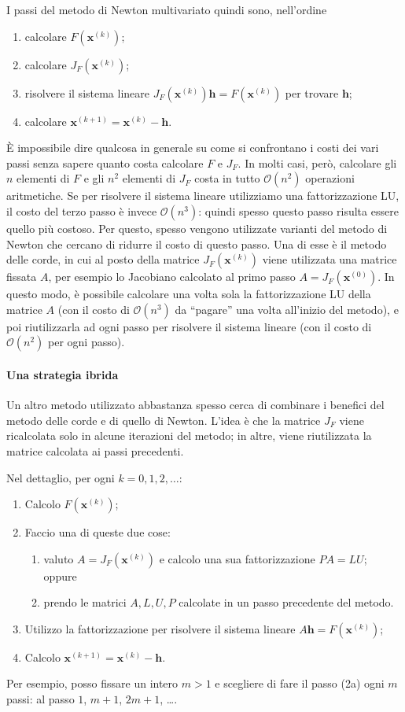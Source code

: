 \documentclass[a4paper]{report}
\theoremstyle{definiton}
\theoremstyle{remark}
\newcommand{\x}{\mathbf{x}}
\begin{document}
I passi del metodo di Newton multivariato quindi sono, nell'ordine
\begin{enumerate}
    \item calcolare $F(\x^{(k)})$;
    \item calcolare $J_F(\x^{(k)})$;
    \item risolvere il sistema lineare $J_F(\x^{(k)}) \mathbf{h} = F(\x^{(k)})$ per trovare $\mathbf{h}$;
    \item calcolare $\x^{(k+1)} = \x^{(k)} - \mathbf{h}$.
\end{enumerate}
È impossibile dire qualcosa in generale su come si confrontano i costi dei vari passi senza sapere quanto costa calcolare $F$ e $J_F$. In molti casi, però, calcolare gli $n$ elementi di $F$ e gli $n^2$ elementi di $J_F$ costa in tutto $\mathcal{O}(n^2)$ operazioni aritmetiche. Se per risolvere il sistema lineare utilizziamo una fattorizzazione LU, il costo del terzo passo è invece $\mathcal{O}(n^3)$: quindi spesso questo passo risulta essere quello più costoso. Per questo, spesso vengono utilizzate varianti del metodo di Newton che cercano di ridurre il costo di questo passo. Una di esse è il metodo delle corde, in cui al posto della matrice $J_F(\x^{(k)})$ viene utilizzata una matrice fissata $A$, per esempio lo Jacobiano calcolato al primo passo $A = J_F(\x^{(0)})$. In questo modo, è possibile calcolare una volta sola la fattorizzazione LU della matrice $A$ (con il costo di $\mathcal{O}(n^3)$ da ``pagare'' una volta all'inizio del metodo), e poi riutilizzarla ad ogni passo per risolvere il sistema lineare (con il costo di $\mathcal{O}(n^2)$ per ogni passo).

\paragraph{Una strategia ibrida} Un altro metodo utilizzato abbastanza spesso cerca di combinare i benefici del metodo delle corde e di quello di Newton. L'idea è che la matrice $J_F$ viene ricalcolata solo in alcune iterazioni del metodo; in altre, viene riutilizzata la matrice calcolata ai passi precedenti.

Nel dettaglio, per ogni $k=0,1,2,\dots$:
\begin{enumerate}
    \item Calcolo $F(\x^{(k)})$;
    \item Faccio una di queste due cose: \begin{enumerate}
        \item valuto $A = J_F(\x^{(k)})$ e calcolo una sua fattorizzazione $PA = LU$; oppure
        \item prendo le matrici $A,L,U,P$ calcolate in un passo precedente del metodo.
    \end{enumerate}
    \item Utilizzo la fattorizzazione per risolvere il sistema lineare $ A \mathbf{h} = F(\x^{(k)})$;
    \item Calcolo $\x^{(k+1)} = \x^{(k)} - \mathbf{h}$.
\end{enumerate}
Per esempio, posso fissare un intero $m>1$ e scegliere di fare il passo (2a) ogni $m$ passi: al passo $1$, $m+1$, $2m+1$, \dots.
\end{document}
